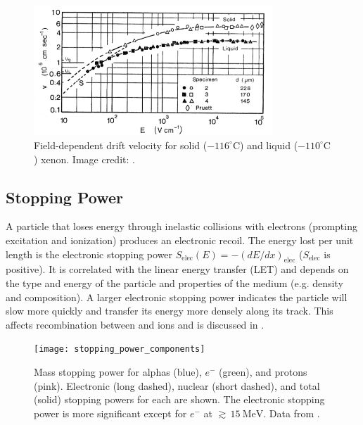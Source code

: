\begin{figure}
\includegraphics[angle=0.5, width=0.8\textwidth]{DriftVelocity}
\caption{Field-dependent drift velocity for solid ($-116^{\circ}\mathrm{C}$) and liquid ($-110^{\circ}\mathrm{C}$) xenon.  Image credit:
.}
\label{fig:drift_velocity}
\end{figure}




\subsection{Stopping Power}
\label{subsec:stopping_power}
A particle that loses energy through inelastic collisions with electrons (prompting excitation and ionization) produces an electronic
recoil.  The energy lost per unit
length is the electronic stopping power $S_{\mathrm{elec}}(E) = -(dE/dx)_{\mathrm{elec}}$ ($S_{\mathrm{elec}}$ is positive).  It is
correlated with the linear energy transfer (LET) and depends on the type and energy of the particle and properties of the
medium (e.g. density and composition).  A larger electronic stopping power indicates the particle will slow more quickly and
transfer its energy more densely along its track.  This affects recombination between \electron and ions and is discussed in
.

\begin{figure}[t]
\texttt{[image: stopping\_power\_components]}
\caption[Mass stopping power for alphas (blue), $e^{-}$ (green), and protons (pink).  Electronic (long dashed), nuclear (short dashed),
and total (solid) stopping powers for each are shown.]{Mass stopping power for alphas (blue), $e^{-}$ (green), and protons
(pink).  Electronic (long dashed), nuclear (short dashed),
and total (solid) stopping powers for each are shown.  The electronic stopping power is more significant except for $e^-$ at
${\gtrsim}\, 15\ \mathrm{MeV}$.  Data from .}
\label{fig:mass_stopping_power}
\end{figure}

